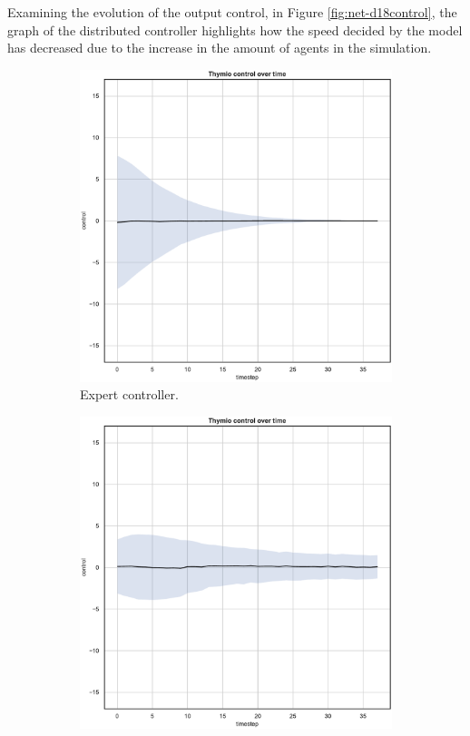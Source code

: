 Examining the evolution of the output control, in Figure \ref{fig:net-d18control}, 
the graph of the distributed controller highlights how the speed decided by the 
model has decreased due to the increase in the amount of agents in the 
simulation.
\begin{figure}[!htb]
	\centering
	\begin{subfigure}[h]{0.3\textwidth}
		\centering
		\includegraphics[width=\textwidth]{contents/images/net-d18/control-overtime-omniscient}%
		\caption{Expert controller.}
	\end{subfigure}
	\hfill
	\begin{subfigure}[h]{0.3\textwidth}
		\centering
		\includegraphics[width=\textwidth]{contents/images/net-d18/control-overtime-manual}%

\end{subfigure}
\end{figure}
